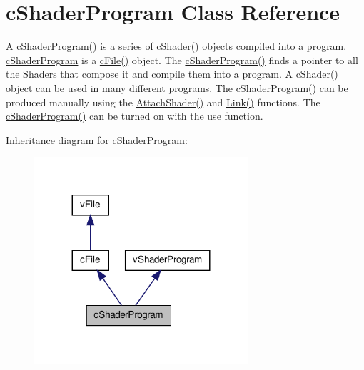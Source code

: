 \hypertarget{classc_shader_program}{
\section{cShaderProgram Class Reference}
\label{classc_shader_program}
}


A \hyperlink{classc_shader_program_ab032906ae85885362543784fea60cc87}{cShaderProgram()} is a series of cShader() objects compiled into a program. \hyperlink{classc_shader_program}{cShaderProgram} is a \hyperlink{classc_file_a5bb81f36e954af61b581e3c1fd06e0de}{cFile()} object. The \hyperlink{classc_shader_program_ab032906ae85885362543784fea60cc87}{cShaderProgram()} finds a pointer to all the Shaders that compose it and compile them into a program. A cShader() object can be used in many different programs. The \hyperlink{classc_shader_program_ab032906ae85885362543784fea60cc87}{cShaderProgram()} can be produced manually using the \hyperlink{classc_shader_program_a0f0adf11f436c0d8149b6c5e196fe859}{AttachShader()} and \hyperlink{classc_shader_program_a2e6bc46c158959bcea66b4e321416b72}{Link()} functions. The \hyperlink{classc_shader_program_ab032906ae85885362543784fea60cc87}{cShaderProgram()} can be turned on with the use function.  




Inheritance diagram for cShaderProgram:
\nopagebreak
\begin{figure}[H]
\begin{center}
\leavevmode
\includegraphics[width=224pt]{classc_shader_program__inherit__graph}
\end{center}
\end{figure}


